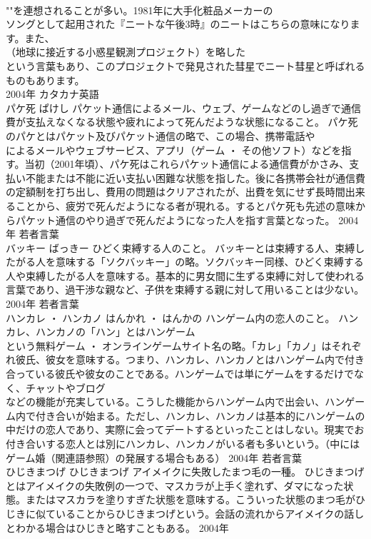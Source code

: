 \documentclass[8pt]{extreport}
\begin{document}
\begin{CJK}{UTF8}{min}
\\	""を連想されることが多い。1981年に大手化粧品メーカーの
\\	ソングとして起用された『ニートな午後3時』のニートはこちらの意味になります。また、
\\	（地球に接近する小惑星観測プロジェクト）を略した
\\	という言葉もあり、このプロジェクトで発見された彗星でニート彗星と呼ばれるものもあります。
\\	2004年	カタカナ英語	
\\	パケ死	ぱけし	パケット通信によるメール、ウェブ、ゲームなどのし過ぎで通信費が支払えなくなる状態や疲れによって死んだような状態になること。	パケ死のパケとはパケット及びパケット通信の略で、この場合、携帯電話や
\\	によるメールやウェブサービス、アプリ（ゲーム ・ その他ソフト）などを指す。当初（2001年頃）、パケ死はこれらパケット通信による通信費がかさみ、支払い不能または不能に近い支払い困難な状態を指した。後に各携帯会社が通信費の定額制を打ち出し、費用の問題はクリアされたが、出費を気にせず長時間出来ることから、疲労で死んだようになる者が現れる。するとパケ死も先述の意味からパケット通信のやり過ぎで死んだようになった人を指す言葉となった。	2004年	若者言葉	
\\	バッキー	ばっきー	ひどく束縛する人のこと。	バッキーとは束縛する人、束縛したがる人を意味する「ソクバッキー」の略。ソクバッキー同様、ひどく束縛する人や束縛したがる人を意味する。基本的に男女間に生ずる束縛に対して使われる言葉であり、過干渉な親など、子供を束縛する親に対して用いることは少ない。	2004年	若者言葉	
\\	ハンカレ ・ ハンカノ	はんかれ ・ はんかの	ハンゲーム内の恋人のこと。	ハンカレ、ハンカノの「ハン」とはハンゲーム
\\	という無料ゲーム ・ オンラインゲームサイト名の略。「カレ」「カノ」はそれぞれ彼氏、彼女を意味する。つまり、ハンカレ、ハンカノとはハンゲーム内で付き合っている彼氏や彼女のことである。ハンゲームでは単にゲームをするだけでなく、チャットやブログ
\\	などの機能が充実している。こうした機能からハンゲーム内で出会い、ハンゲーム内で付き合いが始まる。ただし、ハンカレ、ハンカノは基本的にハンゲームの中だけの恋人であり、実際に会ってデートするといったことはしない。現実でお付き合いする恋人とは別にハンカレ、ハンカノがいる者も多いという。（中にはゲーム婚（関連語参照）の発展する場合もある）	2004年	若者言葉	
\\	ひじきまつげ	ひじきまつげ	アイメイクに失敗したまつ毛の一種。	ひじきまつげとはアイメイクの失敗例の一つで、マスカラが上手く塗れず、ダマになった状態。またはマスカラを塗りすぎた状態を意味する。こういった状態のまつ毛がひじきに似ていることからひじきまつげという。会話の流れからアイメイクの話しとわかる場合はひじきと略すこともある。	2004年	

\end{CJK}
\end{document}
